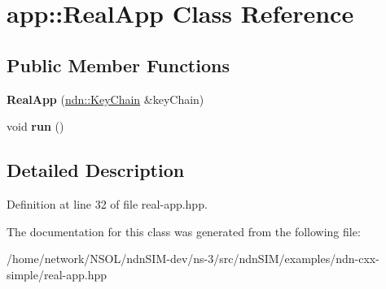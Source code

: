 \hypertarget{classapp_1_1RealApp}{}\section{app\+:\+:Real\+App Class Reference}
\label{classapp_1_1RealApp}
\subsection*{Public Member Functions}
\begin{DoxyCompactItemize}
\item 
{\bfseries Real\+App} (\hyperlink{classndn_1_1security_1_1KeyChain}{ndn\+::\+Key\+Chain} \&key\+Chain)\hypertarget{classapp_1_1RealApp_af5b585b031a6728bcdfcbee2959b1955}{}\label{classapp_1_1RealApp_af5b585b031a6728bcdfcbee2959b1955}

\item 
void {\bfseries run} ()\hypertarget{classapp_1_1RealApp_a17928d633d1975260d38b25f6a2739f6}{}\label{classapp_1_1RealApp_a17928d633d1975260d38b25f6a2739f6}

\end{DoxyCompactItemize}


\subsection{Detailed Description}


Definition at line 32 of file real-\/app.\+hpp.



The documentation for this class was generated from the following file\+:\begin{DoxyCompactItemize}
\item 
/home/network/\+N\+S\+O\+L/ndn\+S\+I\+M-\/dev/ns-\/3/src/ndn\+S\+I\+M/examples/ndn-\/cxx-\/simple/real-\/app.\+hpp\end{DoxyCompactItemize}
